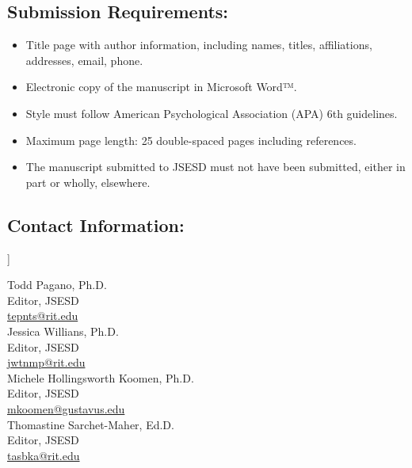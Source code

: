 \documentclass[11pt]{sig-alternate}
\begin{document}
\begin{large}
\begin{@twocolumnfalse}
\subsection*{Submission Requirements:}

\begin{itemize}
    \item Title page with author information, including names, titles, affiliations, addresses, email, phone.
    \item Electronic copy of the manuscript in Microsoft Word™.
    \item Style must follow American Psychological Association (APA) 6th guidelines.
    \item Maximum page length: 25 double-spaced pages including references.
    \item The manuscript submitted to JSESD must not have been submitted, either in part or wholly, elsewhere.
\end{itemize}

\subsection*{Contact Information:}

\end{@twocolumnfalse}]

Todd Pagano, Ph.D.\\Editor, JSESD\\\href{mailto:tepnts@rit.edu}{tepnts@rit.edu}\\

Jessica Willians, Ph.D.\\Editor, JSESD\\\href{mailto:jwtnmp@rit.edu}{jwtnmp@rit.edu}\\

\newpage
Michele Hollingsworth Koomen, Ph.D.\\Editor, JSESD\\\href{mailto:mkoomen@gustavus.edu}{mkoomen@gustavus.edu}\\

Thomastine Sarchet-Maher, Ed.D.\\Editor, JSESD\\\href{mailto:tasbka@rit.edu}{tasbka@rit.edu}\\
\end{large}
\end{document}
